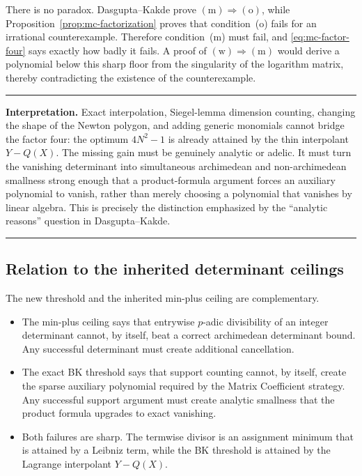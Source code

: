 \documentclass[11pt,oneside]{article}
\theoremstyle{definition}
\theoremstyle{remark}
\newenvironment{resultbox}
{\begin{center}\begin{minipage}{0.94\textwidth}\hrule\vspace{0.45em}}
{\vspace{0.35em}\hrule\end{minipage}\end{center}}
\begin{document}
There is no paradox.  Dasgupta--Kakde prove $(\mathrm m)\Rightarrow(\mathrm o)$, while
Proposition~\ref{prop:mc-factorization} proves that condition~(o) fails for an irrational
counterexample.  Therefore condition~(m) must fail, and
\eqref{eq:mc-factor-four} says exactly how badly it fails.  A proof of
$(\mathrm w)\Rightarrow(\mathrm m)$ would derive a polynomial below this sharp floor from the
singularity of the logarithm matrix, thereby contradicting the existence of the counterexample.

\begin{resultbox}
\textbf{Interpretation.}
Exact interpolation, Siegel-lemma dimension counting, changing the shape of the Newton polygon,
and adding generic monomials cannot bridge the factor four: the optimum $4N^2-1$ is already
attained by the thin interpolant $Y-Q(X)$.  The missing gain must be genuinely analytic or
adelic.  It must turn the vanishing determinant into simultaneous archimedean and
non-archimedean smallness strong enough that a product-formula argument forces an auxiliary
polynomial to vanish, rather than merely choosing a polynomial that vanishes by linear
algebra.  This is precisely the distinction emphasized by the ``analytic reasons'' question in
Dasgupta--Kakde.
\end{resultbox}

\subsection{Relation to the inherited determinant ceilings}

The new threshold and the inherited min-plus ceiling are complementary.

\begin{itemize}
\item The min-plus ceiling says that entrywise $p$-adic divisibility of an integer determinant
cannot, by itself, beat a correct archimedean determinant bound.  Any successful determinant
must create additional cancellation.
\item The exact BK threshold says that support counting cannot, by itself, create the sparse
auxiliary polynomial required by the Matrix Coefficient strategy.  Any successful support
argument must create analytic smallness that the product formula upgrades to exact vanishing.
\item Both failures are sharp.  The termwise divisor is an assignment minimum that is attained
by a Leibniz term, while the BK threshold is attained by the Lagrange interpolant
$Y-Q(X)$.
\end{itemize}
\end{document}
